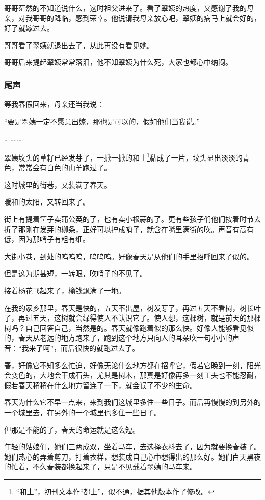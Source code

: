 \par 哥哥茫然的不知道说什么，这时祖父进来了。看了翠姨的热度，又感谢了我的母亲，对我哥哥的降临，感到荣幸。他说请我母亲放心吧，翠姨的病马上就会好的，好了就嫁过去。
\par 哥哥看了翠姨就退出去了，从此再没有看见她。
\par 哥哥后来提起翠姨常常落泪，他不知翠姨为什么死，大家也都心中纳闷。
\subsubsection*{尾声}
\par 等我春假回来，母亲还当我说：
\par “要是翠姨一定不愿意出嫁，那也是可以的，假如他们当我说。”
\par …………
\par 翠姨坟头的草籽已经发芽了，一掀一掀的和土\footnote{“和土”，初刊文本作“都上”，似不通，据其他版本作了修改。}黏成了一片，坟头显出淡淡的青色，常常会有白色的山羊跑过了。
\par 这时城里的街巷，又装满了春天。
\par 暖和的太阳，又转回来了。
\par 街上有提着筐子卖蒲公英的了，也有卖小根蒜的了。更有些孩子们他们按着时节去折了那刚在发芽的柳条，正好可以拧成哨子，就含在嘴里满街的吹。声音有高有低，因为那哨子有粗有细。
\par 大街小巷，到处的呜呜呜，呜呜呜。好像春天是从他们的手里招呼回来了似的。
\par 但是这为期甚短，一转眼，吹哨子的不见了。
\par 接着杨花飞起来了，榆钱飘满了一地。
\par 在我的家乡那里，春天是快的，五天不出屋，树发芽了，再过五天不看树，树长叶了，再过五天，这树就会绿得使人不认识它了。使人想，这棵树，就是前天的那棵树吗？自己回答自己，当然是的。春天就像跑着似的那么快。好像人能够看见似的，春天从老远的地方跑来了，跑到这个地方只向人的耳朵吹一句小小的声音：“我来了呵”，而后很快的就跑过去了。
\par 春，好像它不知多么忙迫，好像无论什么地方都在招呼它，假若它晚到一刻，阳光会变色的，大地会干成石头，尤其是树木，那真是好像再多一刻工夫也不能忍耐，假若春天稍稍在什么地方留连了一下，就会误了不少的生命。
\par 春天为什么它不早一点来，来到我们这城里多住一些日子。而后再慢慢的到另外的一个城里去，在另外的一个城里也多住一些日子。
\par 但那是不能的了，春天的命运就是这么短。
\par 年轻的姑娘们，她们三两成双，坐着马车，去选择衣料去了，因为就要换春装了。她们热心的弄着剪刀，打着衣样，想装成自己心中想得出的那么好。她们白天黑夜的忙着，不久春装都换起来了，只是不见载着翠姨的马车来。
\par {}
\par {}










